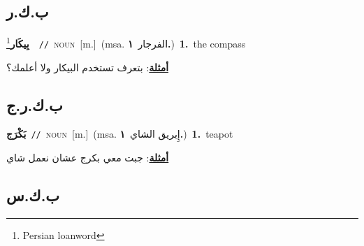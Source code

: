 \documentclass[10pt,a4paper,twoside]{article} %
\begin{document}
\begin{multicols}{2}
\vspace{-3mm}
\subsection*{\color{blue}\foreignlanguage{arabic}{ب.ك.ر}\color{blue}{ (ntws)}} 

{\setlength\topsep{0pt}\textbf{\foreignlanguage{arabic}{بِيكَار}}\footnote{Persian loanword}\ \ {\color{gray}\texttt{//}\color{black}}\ \textsc{noun}\ [m.]\ \color{gray}(msa. \foreignlanguage{arabic}{الفرجار}~\foreignlanguage{arabic}{\textbf{١.}})\color{black}\ \textbf{1.}~the compass\  \begin{flushright}\color{gray}\foreignlanguage{arabic}{\textbf{\underline{\foreignlanguage{arabic}{أمثلة}}}: بتعرف تستخدم البيكار ولا أعلمك؟}\end{flushright}\color{black}} \vspace{2mm}

\vspace{-3mm}
\subsection*{\color{blue}\foreignlanguage{arabic}{ب.ك.ر.ج}\color{blue}{}} 

{\setlength\topsep{0pt}\textbf{\foreignlanguage{arabic}{بَكْرَج}}\ {\color{gray}\texttt{//}\color{black}}\ \textsc{noun}\ [m.]\ \color{gray}(msa. \foreignlanguage{arabic}{إِبريق الشاي}~\foreignlanguage{arabic}{\textbf{١.}})\color{black}\ \textbf{1.}~teapot\  \begin{flushright}\color{gray}\foreignlanguage{arabic}{\textbf{\underline{\foreignlanguage{arabic}{أمثلة}}}: جبت معي بكرج عشان نعمل شاي}\end{flushright}\color{black}} \vspace{2mm}

\vspace{-3mm}
\subsection*{\color{blue}\foreignlanguage{arabic}{ب.ك.س}\color{blue}{}} 


\end{multicols}
\end{document}
